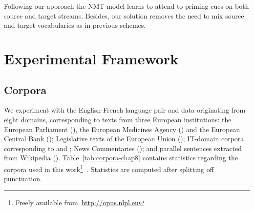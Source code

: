 Following our approach the NMT model learns to attend to priming cues on both source and target streams.
Besides, our solution removes the need to mix source and target vocabularies as in  previous schemes.

\section{Experimental Framework}
\label{sec:eperiments-chap8}

\subsection{Corpora}
\label{ssec:corpora-chap8}

We experiment with the English-French language pair and data originating from eight domains, corresponding to texts from three European institutions: 
the European Parliament (), 
the European Medicines Agency () and
the European Central Bank ();
Legislative texts of the European Union ();
IT-domain corpora corresponding to  and ;
News Commentaries ();
and parallel sentences extracted from Wikipedia ().
%
Table~\ref{tab:corpora-chap8} contains statistics regarding the corpora used in this work\footnote{Freely available from~\url{http://opus.nlpl.eu}}~\cite{Tiedemann12parallel}. Statistics are computed after splitting off punctuation.

